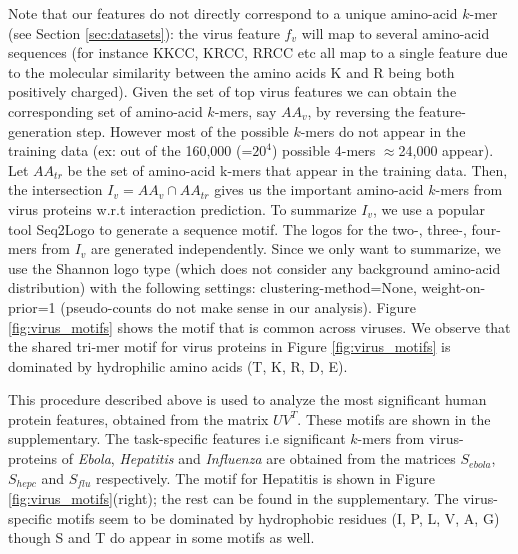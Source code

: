 \documentclass{bioinfo}
\begin{document}
Note that our features do not directly correspond to a unique amino-acid $k$-mer (see Section \ref{sec:datasets}): 
the virus feature $f_v$ will map to several amino-acid sequences (for instance KKCC, KRCC, RRCC etc all map to a single feature due to the molecular similarity between the amino acids K and R being both positively charged). Given the set of top virus features we can obtain the corresponding set of 
amino-acid $k$-mers, say $AA_v$, by reversing the feature-generation step. However most of the possible $k$-mers do not appear in the 
training data (ex: out of the 160,000 (=$20^4$) possible 4-mers $\approx$24,000 appear). Let $AA_{tr}$
be the set of amino-acid k-mers that appear in the training data. Then, the intersection $I_v = AA_v \cap AA_{tr}$ gives us the important amino-acid $k$-mers from virus proteins w.r.t interaction prediction. 
To summarize $I_v$, we use a popular tool Seq2Logo \citep{seq2logo} to generate a sequence motif. 
The logos for the two-, three-, four-mers from $I_v$ are generated independently. Since we only
want to summarize, we use the Shannon logo type (which does not consider any background amino-acid distribution)
with the following settings: clustering-method=None, weight-on-prior=1 (pseudo-counts do not make sense in our
analysis). Figure \ref{fig:virus_motifs} shows the motif that is common across viruses. %
We observe that the shared tri-mer motif for virus proteins in Figure \ref{fig:virus_motifs} is dominated by 
hydrophilic amino acids (T, K, R, D, E).

This procedure described above is used to analyze the most significant human protein features, obtained from
the matrix $U V^T$. These motifs are shown in the supplementary. The task-specific features i.e significant $k$-mers from virus-proteins of \textit{Ebola}, \textit{Hepatitis} and \textit{Influenza} are obtained from the matrices $S_{ebola}$, $S_{hepc}$ and $S_{flu}$ respectively. The motif for Hepatitis is shown in Figure \ref{fig:virus_motifs}(right); the rest can be found in the supplementary. %
The virus-specific motifs seem to be dominated by hydrophobic residues (I, P, L, V, A, G) though S and T do appear in some motifs as well.
\end{document}
